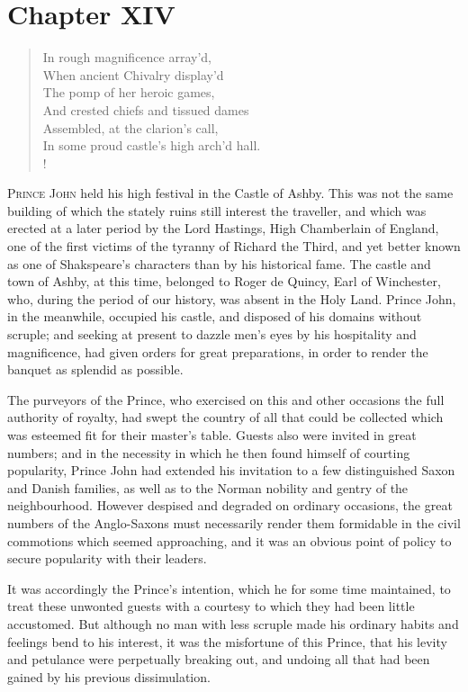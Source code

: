 \chapter{Chapter XIV}

\begin{verse}
In rough magnificence array'd,\\
When ancient Chivalry display'd\\
The pomp of her heroic games,\\
And crested chiefs and tissued dames\\
Assembled, at the clarion's call,\\
In some proud castle's high arch'd hall.\\!
\end{verse}

\lettrine{P}{rince John} held his high festival in the Castle of Ashby.
This was not
the same building of which the stately ruins still interest the
traveller, and which was erected at a later period by the Lord Hastings,
High Chamberlain of England, one of the first victims of the tyranny of
Richard the Third, and yet better known as one of Shakspeare's
characters than by his historical fame. The castle and town of Ashby, at
this time, belonged to Roger de Quincy, Earl of Winchester, who, during
the period of our history, was absent in the Holy Land. Prince John, in
the meanwhile, occupied his castle, and disposed of his domains without
scruple; and seeking at present to dazzle men's eyes by his hospitality
and magnificence, had given orders for great preparations, in order to
render the banquet as splendid as possible.

The purveyors of the Prince, who exercised on this and other occasions
the full authority of royalty, had swept the country of all that could
be collected which was esteemed fit for their master's table. Guests
also were invited in great numbers; and in the necessity in which he
then found himself of courting popularity, Prince John had extended his
invitation to a few distinguished Saxon and Danish families, as well as
to the Norman nobility and gentry of the neighbourhood. However despised
and degraded on ordinary occasions, the great numbers of the
Anglo-Saxons must necessarily render them formidable in the civil
commotions which seemed approaching, and it was an obvious point of
policy to secure popularity with their leaders.

It was accordingly the Prince's intention, which he for some time
maintained, to treat these unwonted guests with a courtesy to which they
had been little accustomed. But although no man with less scruple made
his ordinary habits and feelings bend to his interest, it was the
misfortune of this Prince, that his levity and petulance were
perpetually breaking out, and undoing all that had been gained by his
previous dissimulation.

